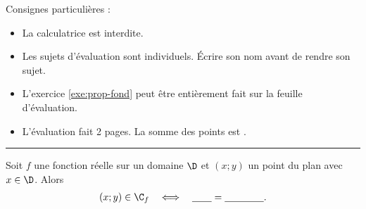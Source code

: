 

\SetDate[03/11/2025]
\reversemarginpar
\setlength{\marginparsep}{.5cm}


\pagestyle{fancy}
\fancyhead[R]{\today}

\null\vspace{-30pt}
Consignes particulières : 
\begin{itemize}[label=$\bullet$]
	\item 
	La calculatrice est {interdite}.
	\item
	Les sujets d'évaluation sont individuels. Écrire son nom avant de rendre son sujet.
	\item
	L'exercice \ref{exe:prop-fond} peut être entièrement fait sur la feuille d'évaluation.
	\item
	L'évaluation fait 2 pages. La somme des points est .
\end{itemize}

\marginpar{[pts]}
\hrule

\begin{thm}\label{thm:1}
	Soit $f$ une fonction réelle sur un domaine $\D$ et $(x;y)$ un point du plan avec $x\in\D$.
	Alors
		\begin{align*}
			(x ; y) \in \C_f && \iff && \underline{\qquad} = \underline{\qquad\qquad}.
		\end{align*}
\end{thm}


